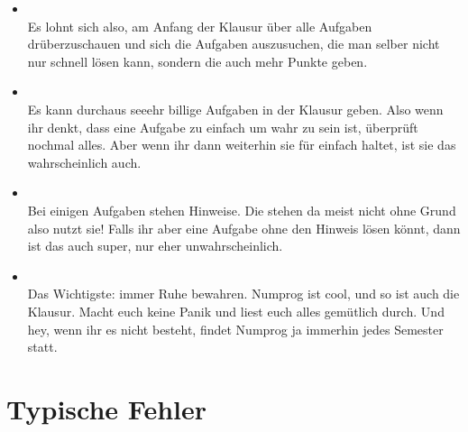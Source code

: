 \begin{itemize}
	\item {}\\
	Es lohnt sich also, am Anfang der Klausur über alle Aufgaben drüberzuschauen und sich die Aufgaben auszusuchen, die man selber nicht nur schnell lösen kann, sondern die auch mehr Punkte geben.
	
	\item {} \\
	Es kann durchaus seeehr billige Aufgaben in der Klausur geben. Also wenn ihr denkt, dass eine Aufgabe zu einfach um wahr zu sein ist, überprüft nochmal alles. Aber wenn ihr dann weiterhin sie für einfach haltet, ist sie das wahrscheinlich auch.
	
	\item {} \\
	Bei einigen Aufgaben stehen Hinweise. Die stehen da meist nicht ohne Grund also nutzt sie! Falls ihr aber eine Aufgabe ohne den Hinweis lösen könnt, dann ist das auch super, nur eher unwahrscheinlich. \Smiley
	
	\item {} \\
	Das Wichtigste: immer Ruhe bewahren. Numprog ist cool, und so ist auch die Klausur. Macht euch keine Panik und liest euch alles gemütlich durch. Und hey, wenn ihr es nicht besteht, findet Numprog ja immerhin jedes Semester statt. \Winkey
	
\end{itemize}

\newpage
\section{Typische Fehler}

